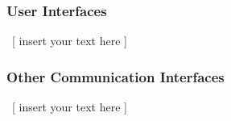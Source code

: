 \documentclass[twoside,letterpaper]{article}
\begin{document}
\subsubsection[User Interfaces]{\rmfamily\bfseries\color{black} User Interfaces}
\hypertarget{RefHeading21259017292}{}{\color{black}
\foreignlanguage{english}{\ [ insert your text here ]}}

\subsubsection[Other Communication Interfaces]{\rmfamily\bfseries\color{black} Other
Communication Interfaces}
\hypertarget{RefHeading21459017292}{}{\color{black}
\foreignlanguage{english}{\ [ insert your text here ]}}


\bigskip


\bigskip

\bigskip
\clearpage\setcounter{page}{1}\pagestyle{Convertiv}

\bigskip
\end{document}
